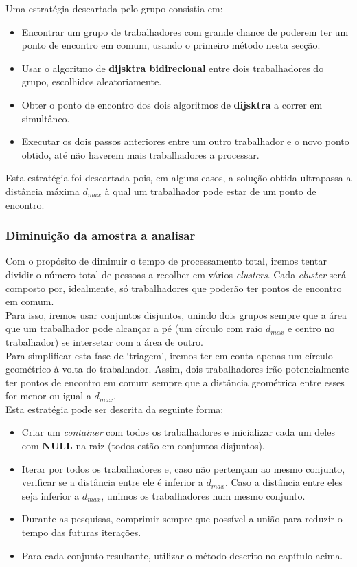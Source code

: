 \documentclass{report}
\begin{document}
      Uma estratégia descartada pelo grupo consistia em:
      \begin{itemize}
      \item Encontrar um grupo de trabalhadores com grande chance de poderem ter
        um ponto de encontro em comum, usando o primeiro método nesta secção.
      \item Usar o algoritmo de \textbf{dijsktra bidirecional} entre dois
        trabalhadores do grupo, escolhidos aleatoriamente.
      \item Obter o ponto de encontro dos dois algoritmos de \textbf{dijsktra} a
        correr em simultâneo.
      \item Executar os dois passos anteriores entre um outro trabalhador e o
        novo ponto obtido, até não haverem mais trabalhadores a processar.
      \end{itemize}
      Esta estratégia foi descartada pois, em alguns casos, a solução obtida
      ultrapassa a distância máxima $d_{max}$ à qual um trabalhador pode estar
      de um ponto de encontro.

    \subsubsection{Diminuição da amostra a analisar}
      Com o propósito de diminuir o tempo de processamento total, iremos
      tentar dividir o número total de pessoas a recolher em vários
      \textit{clusters}. Cada \textit{cluster} será composto por, idealmente,
      só trabalhadores que poderão ter pontos de encontro em comum.\\  
      Para isso, iremos usar conjuntos disjuntos, unindo dois grupos
      sempre que a área que um trabalhador pode alcançar a pé (um círculo
      com raio $d_{max}$ e centro no trabalhador) se intersetar com a área
      de outro.\\
      Para simplificar esta fase de `triagem', iremos ter em conta apenas
      um círculo geométrico à volta do trabalhador. Assim, dois trabalhadores
      irão potencialmente ter pontos de encontro em comum sempre que a
      distância geométrica entre esses for menor ou igual a $d_{max}$.\\
      Esta estratégia pode ser descrita da seguinte forma:
      \begin{itemize}
      \item Criar um \textit{container} com todos os trabalhadores e inicializar
      cada um deles com \textbf{NULL} na raiz (todos estão em conjuntos disjuntos).
      \item Iterar por todos os trabalhadores e, caso não pertençam ao mesmo
      conjunto, verificar se a distância entre ele é inferior a $d_{max}$.
      Caso a distância entre eles seja inferior a $d_{max}$, unimos os
      trabalhadores num mesmo conjunto.
      \item Durante as pesquisas, comprimir sempre que possível a união para
      reduzir o tempo das futuras iterações.
      \item Para cada conjunto resultante, utilizar o método descrito no
      capítulo acima.
      \end{itemize}
\end{document}
